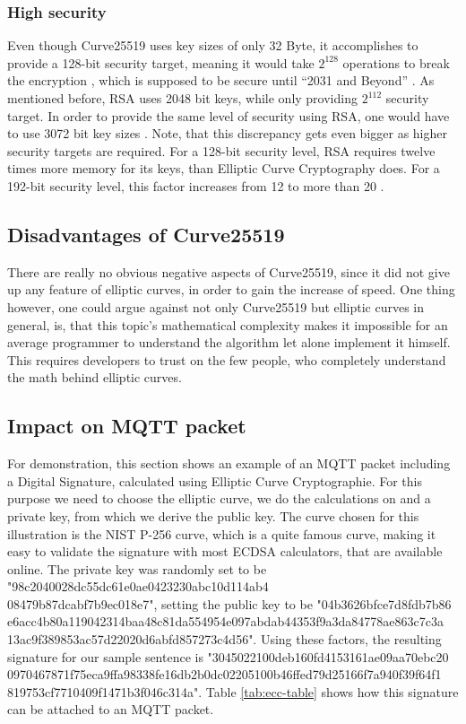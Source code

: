 \subsubsection{High security}
Even though Curve25519 uses key sizes of only 32 Byte, it accomplishes to provide a 128-bit security target, meaning it would take $ 2^{128} $ operations to break the encryption \cite{SecLevel}, which is supposed to be secure until “2031 and Beyond” \cite{KeySize}. As mentioned before, RSA uses 2048 bit keys, while only providing $ 2^{112} $ security target. In order to provide the same level of security using RSA, one would have to use 3072 bit key sizes \cite{KeySize}. Note, that this discrepancy gets even bigger as higher security targets are required. For a 128-bit security level, RSA requires twelve times more memory for its keys, than Elliptic Curve Cryptography does. For a 192-bit security level, this factor increases from 12 to more than 20 \cite{SecLevelInc}.

\subsection{Disadvantages of Curve25519}
There are really no obvious negative aspects of Curve25519, since it did not give up any feature of elliptic curves, in order to gain the increase of speed. One thing however, one could argue against not only Curve25519 but elliptic curves in general, is, that this topic's mathematical complexity makes it impossible for an average programmer to understand the algorithm let alone implement it himself. This requires developers to trust on the few people, who completely understand the math behind elliptic curves.

\newpage

\subsection{Impact on MQTT packet}
For demonstration, this section shows an example of an MQTT packet including a Digital Signature, calculated using Elliptic Curve Cryptographie. For this purpose we need to choose the elliptic curve, we do the calculations on and a private key, from which we derive the public key. The curve chosen for this illustration is the NIST P-256 curve, which is a quite famous curve, making it easy to validate the signature with most ECDSA calculators, that are available online. The private key was randomly set to be "98c2040028dc55dc61e0ae0423230abc10d114ab4\\08479b87dcabf7b9ec018e7", setting the public key to be "04b3626bfce7d8fdb7b86\\e6acc4b80a119042314baa48c81da554954e097abdab44353f9a3da84778ae863c7c3a\\13ac9f389853ac57d22020d6abfd857273c4d56".
Using these factors, the resulting signature for our sample sentence is "3045022100deb160fd4153161ae09aa70ebc20\\0970467871f75eca9ffa98338fe16db2b0dc02205100b46ffed79d25166f7a940f39f64f1\\819753cf7710409f1471b3f046c314a". Table \ref{tab:ecc-table} shows how this signature can be attached to an MQTT packet.

